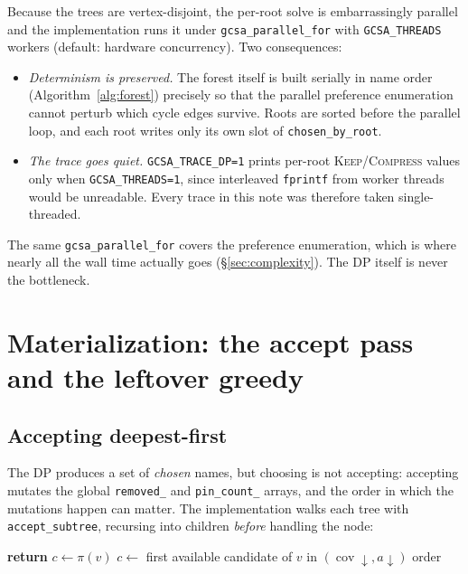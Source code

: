 \documentclass[11pt,a4paper]{article}
\theoremstyle{definition}
\theoremstyle{plain}
\theoremstyle{remark}
\newcommand{\cov}{\operatorname{cov}}
\newcommand{\pref}{\pi}
\newcommand{\KEEP}{\textnormal{\textsc{Keep}}}
\newcommand{\COMP}{\textnormal{\textsc{Compress}}}
\begin{document}
Because the trees are vertex-disjoint, the per-root solve is embarrassingly
parallel and the implementation runs it under
\texttt{gcsa\_parallel\_for} with \texttt{GCSA\_THREADS} workers
(default: hardware concurrency). Two consequences:

\begin{itemize}
\item \emph{Determinism is preserved.} The forest itself is built
  serially in name order (Algorithm~\ref{alg:forest}) precisely so that
  the parallel preference enumeration cannot perturb which cycle edges
  survive. Roots are sorted before the parallel loop, and each root
  writes only its own slot of \texttt{chosen\_by\_root}.
\item \emph{The trace goes quiet.} \texttt{GCSA\_TRACE\_DP=1} prints
  per-root \KEEP/\COMP{} values only when
  \texttt{GCSA\_THREADS=1}, since interleaved \texttt{fprintf} from
  worker threads would be unreadable. Every trace in this note was
  therefore taken single-threaded.
\end{itemize}

The same \texttt{gcsa\_parallel\_for} covers the preference enumeration,
which is where nearly all the wall time actually goes
(\S\ref{sec:complexity}). The DP itself is never the bottleneck.

\section{Materialization: the accept pass and the leftover greedy}
\label{sec:accept}

\subsection{Accepting deepest-first}

The DP produces a set of \emph{chosen} names, but choosing is not
accepting: accepting mutates the global \texttt{removed\_} and
\texttt{pin\_count\_} arrays, and the order in which the mutations happen
can matter. The implementation walks each tree with
\texttt{accept\_subtree}, recursing into children \emph{before} handling
the node:

\begin{algorithm}[t]
\caption{Materialize the DP's decisions}
\label{alg:accept}
\begin{algorithmic}[1]
    \EndFor
   \textbf{return} \EndIf
  \State $c \gets \pref(v)$
     \State $c \gets$ first available candidate of $v$ in
       $(\cov \downarrow, a \downarrow)$ order
  \EndIf
  \If{$\cov(c) \ge \kappa$}  \EndIf
\EndFunction
\end{algorithmic}
\end{algorithm}
\end{document}
